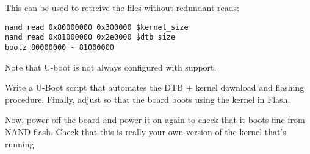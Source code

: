 This can be used to retreive the files without redundant reads:

\begin{verbatim}
nand read 0x80000000 0x300000 $kernel_size
nand read 0x81000000 0x2e0000 $dtb_size
bootz 80000000 - 81000000
\end{verbatim}

Note that U-boot is not always configured
with  support.

Write a U-Boot script that automates the DTB + kernel download
and flashing procedure. Finally, adjust  so that
the board boots using the kernel in Flash.

Now, power off the board and power it on again to check that it boots
fine from NAND flash. Check that this is really your own version of
the kernel that's running.

